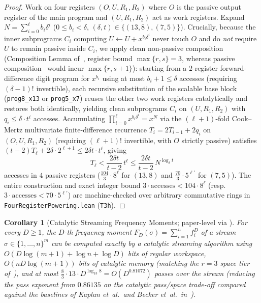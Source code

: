 \documentclass[11pt,reqno]{amsart}
\newtheorem{corollary}[theorem]{Corollary}
\theoremstyle{definition}
\begin{document}
\begin{proof}
Work on four registers $(O, U, R_1, R_2)$ where $O$ is the passive output register of the main program and $(U, R_1, R_2)$ act as work registers.
Expand $N = \sum_{i=0}^\ell b_i \delta^i$ ($0 \le b_i < \delta$, $(\delta, t) \in \{(13, 8), (7, 5)\}$).
Crucially, because the inner subprograms $C_i$ computing $U \leftarrow U + x^{b_i \delta^i}$ never touch $O$ and do \emph{not} require $U$ to remain passive inside $C_i$, we apply clean non-passive composition (Composition Lemma of~\cite{AFM2025}, register bound $\max\{r, s\} = 3$, whereas passive composition~\cite[Lemma~2.2]{Vinciguerra2026} would incur $\max\{r, s+1\}$): starting from a $2$-register forward-difference digit program for $x^{b_i}$ using at most $b_i + 1 \le \delta$ accesses (requiring $(\delta - 1)!$ invertible), each recursive substitution of the scalable base block (\texttt{prog8\_x13} or \texttt{prog5\_x7}) reuses the other two work registers catalytically and restores both identically, yielding clean subprograms $C_i$ on $(U, R_1, R_2)$ with $q_i \le \delta \cdot t^i$ accesses.
Accumulating $\prod_{i=0}^\ell x^{b_i \delta^i} = x^N$ via the $(\ell + 1)$-fold Cook--Mertz multivariate finite-difference recurrence $T_i = 2 T_{i-1} + 2 q_i$ on $(O, U, R_1, R_2)$ (requiring $(\ell + 1)!$ invertible, with $O$ strictly passive) satisfies $(t - 2) T_\ell + 2\delta \cdot 2^{\ell+1} \le 2\delta t \cdot t^\ell$, giving
\[
  T_\ell < \frac{2\delta t}{t - 2} \, t^\ell \le \frac{2\delta t}{t - 2} \, N^{\log_\delta t}
\]
accesses in $4$ passive registers ($\frac{104}{3} \cdot 8^\ell$ for $(13, 8)$ and $\frac{70}{3} \cdot 5^{\ell'}$ for $(7, 5)$).
The entire construction and exact integer bound $3 \cdot \mathrm{accesses} < 104 \cdot 8^\ell$ (resp.\ $3 \cdot \mathrm{accesses} < 70 \cdot 5^{\ell'}$) are machine-checked over arbitrary commutative rings in \texttt{FourRegisterPowering.lean} (\texttt{T3h}).
\end{proof}

\begin{corollary}[Catalytic Streaming Frequency Moments; paper-level via {\cite[Corollary~5.1.1]{Vinciguerra2026}}]
\label{cor:streaming}
For every $D \ge 1$, the $D$-th frequency moment $F_D(\sigma) = \sum_{i=1}^n f_i^D$ of a stream $\sigma \in \{1, \dots, n\}^m$ can be computed exactly by a catalytic streaming algorithm using $O(D \log(m + 1) + \log n + \log D)$ bits of regular workspace, $O(n D \log(m + 1))$ bits of catalytic memory (matching the $r = 3$ space tier of~\cite[Corollary~5.1.1]{Vinciguerra2026}), and at most $\frac{8}{3} \cdot 13 \cdot D^{\log_{13} 8} = O(D^{0.81072})$ passes over the stream (reducing the pass exponent from $0.86135$ on the catalytic pass/space trade-off compared against the baselines of Kaplan et~al.\ and Becker et~al.\ in~\cite[\S5.1]{Vinciguerra2026}).
\end{corollary}
\end{document}
